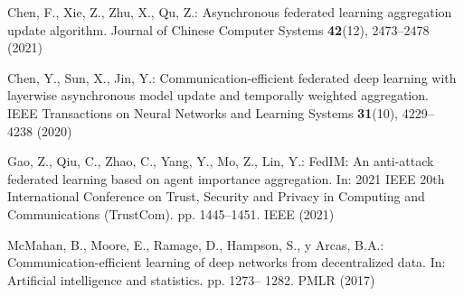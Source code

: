 \documentclass[twoside,twocolumn]{article}
\begin{document}
\begin{spacing}{1.0}
\begin{thebibliography}{00}
 Chen, F., Xie, Z., Zhu, X., Qu, Z.: Asynchronous federated learning aggregation update algorithm. Journal of Chinese Computer Systems \textbf{42}(12), 2473–2478 (2021)
 \vspace{-0.3cm}
 
 Chen, Y., Sun, X., Jin, Y.: Communication-efficient federated deep learning with layerwise asynchronous model update and temporally weighted aggregation. IEEE Transactions on Neural Networks and Learning Systems \textbf{31}(10), 4229– 4238 (2020)
  \vspace{-0.3cm}
 
 
  Gao, Z., Qiu, C., Zhao, C., Yang, Y., Mo, Z., Lin, Y.: FedIM: An anti-attack federated learning based on agent importance aggregation. In: 2021 IEEE 20th International Conference on Trust, Security and Privacy in Computing and Communications (TrustCom). pp. 1445–1451. IEEE (2021)
 \vspace{-0.3cm}
 
  McMahan, B., Moore, E., Ramage, D., Hampson, S., y Arcas, B.A.: Communication-efficient learning of deep networks from decentralized data. In: Artificial intelligence and statistics. pp. 1273– 1282. PMLR (2017)
 

  


 

 

 
\end{thebibliography}  


%
 \end{spacing}
\end{document}
